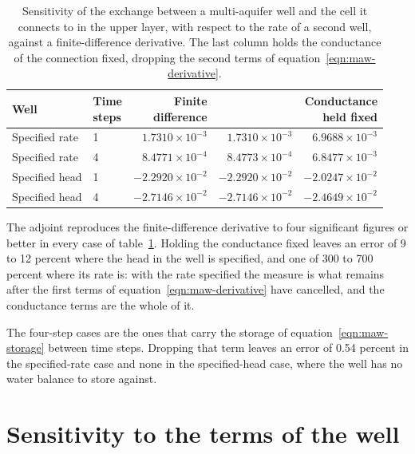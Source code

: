 \begin{table}[htb]
	\centering
	\caption{Sensitivity of the exchange between a multi-aquifer well and the
	cell it connects to in the upper layer, with respect to the rate of a second
	well, against a finite-difference derivative. The last column holds the
	conductance of the connection fixed, dropping the second terms of
	equation~\ref{eqn:maw-derivative}.}
	\label{tab:maw}
	\small
	\begin{tabular}{llrrr}
		\toprule
		Well & \shortstack[l]{Time\\steps} &
		\shortstack[r]{Finite\\difference} &
		\shortstack[r]{Adjoint} &
		\shortstack[r]{Conductance\\held fixed} \\
		\midrule
		Specified rate & 1 & $1.7310 \times 10^{-3}$ & $1.7310 \times 10^{-3}$ & $6.9688 \times 10^{-3}$ \\
		Specified rate & 4 & $8.4771 \times 10^{-4}$ & $8.4773 \times 10^{-4}$ & $6.8477 \times 10^{-3}$ \\
		Specified head & 1 & $-2.2920 \times 10^{-2}$ & $-2.2920 \times 10^{-2}$ & $-2.0247 \times 10^{-2}$ \\
		Specified head & 4 & $-2.7146 \times 10^{-2}$ & $-2.7146 \times 10^{-2}$ & $-2.4649 \times 10^{-2}$ \\
		\bottomrule
	\end{tabular}
\end{table}

The adjoint reproduces the finite-difference derivative to four significant figures or better in every case of table~\ref{tab:maw}. Holding the conductance fixed leaves an error of 9 to 12 percent where the head in the well is specified, and one of 300 to 700 percent where its rate is: with the rate specified the measure is what remains after the first terms of equation~\ref{eqn:maw-derivative} have cancelled, and the conductance terms are the whole of it.

The four-step cases are the ones that carry the storage of equation~\ref{eqn:maw-storage} between time steps. Dropping that term leaves an error of 0.54 percent in the specified-rate case and none in the specified-head case, where the well has no water balance to store against.

\section*{Sensitivity to the terms of the well}

